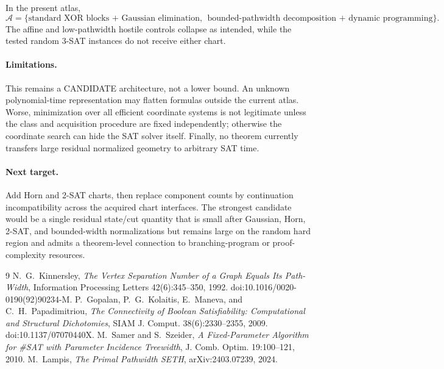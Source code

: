 In the present atlas,
\[
\mathcal A=
\{\text{standard XOR blocks + Gaussian elimination},\
\ \text{bounded-pathwidth decomposition + dynamic programming}\}.
\]
The affine and low-pathwidth hostile controls collapse as intended, while the tested random 3-SAT instances do not receive either chart.

\paragraph{Limitations.}
This remains a CANDIDATE architecture, not a lower bound. An unknown polynomial-time representation may flatten formulas outside the current atlas. Worse, minimization over all efficient coordinate systems is not legitimate unless the class and acquisition procedure are fixed independently; otherwise the coordinate search can hide the SAT solver itself. Finally, no theorem currently transfers large residual normalized geometry to arbitrary SAT time.

\paragraph{Next target.}
Add Horn and 2-SAT charts, then replace component counts by continuation incompatibility across the acquired chart interfaces. The strongest candidate would be a single residual state/cut quantity that is small after Gaussian, Horn, 2-SAT, and bounded-width normalizations but remains large on the random hard region and admits a theorem-level connection to branching-program or proof-complexity resources.

\begin{thebibliography}{9}
 N.~G.~Kinnersley, \emph{The Vertex Separation Number of a Graph Equals Its Path-Width}, Information Processing Letters 42(6):345--350, 1992. doi:10.1016/0020-0190(92)90234-M.
\bibitem{GKMP09} P.~Gopalan, P.~G.~Kolaitis, E.~Maneva, and C.~H.~Papadimitriou, \emph{The Connectivity of Boolean Satisfiability: Computational and Structural Dichotomies}, SIAM J. Comput. 38(6):2330--2355, 2009. doi:10.1137/07070440X.
\bibitem{SamerSzeider10} M.~Samer and S.~Szeider, \emph{A Fixed-Parameter Algorithm for \#SAT with Parameter Incidence Treewidth}, J. Comb. Optim. 19:100--121, 2010.
\bibitem{Lampis24} M.~Lampis, \emph{The Primal Pathwidth SETH}, arXiv:2403.07239, 2024.
\end{thebibliography}

